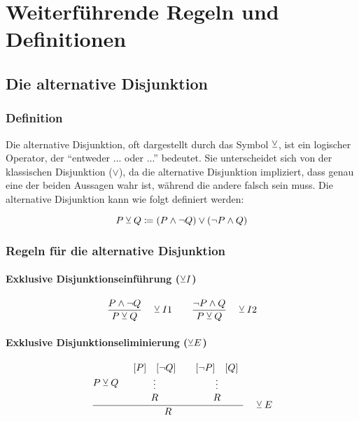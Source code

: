 \documentclass[main.tex]{subfiles}
\begin{document}
\section{Weiterführende Regeln und Definitionen}
\subsection{Die alternative Disjunktion}
\subsubsection{Definition}


Die alternative Disjunktion, oft dargestellt durch das Symbol \(\mathbin{\veebar}\), ist ein logischer Operator, der "`entweder ... oder ..."' bedeutet. Sie unterscheidet sich von der klassischen Disjunktion (\(\lor\)), da die alternative Disjunktion impliziert, dass genau eine der beiden Aussagen wahr ist, während die andere falsch sein muss. Die alternative Disjunktion kann wie folgt definiert werden:

\begin{definition}[XOR]
\label{XOr}
\[
P \mathbin{\veebar} Q \coloneqq (P \land \neg Q) \lor (\neg P \land Q)
\]
\end{definition}

\subsubsection{Regeln für die alternative Disjunktion}


\paragraph{Exklusive Disjunktionseinführung ($\mathbin{\veebar} I$)}
\label{rule:XOrI1}\label{rule:XOrI2}
\[
\frac{P \land \neg Q}{P \mathbin{\veebar} Q}
\quad \mathbin{\veebar} I1
\quad\quad
\frac{\neg P \land Q}{P \mathbin{\veebar} Q}
\quad \mathbin{\veebar} I2
\]

\paragraph{Exklusive Disjunktionseliminierung ($\mathbin{\veebar} E$)}
\label{rule:XOrE} 
\[
\frac{
  P \mathbin{\veebar} Q
  \quad
  \begin{array}{c}
    [P]\quad   [\neg Q]\\
    \vdots \\
    R
  \end{array}
  \quad
  \begin{array}{c}
    [\neg P]\quad  [Q]\\
    \vdots \\
    R
  \end{array}
}{R}
\quad \mathbin{\veebar} E
\]
\end{document}
